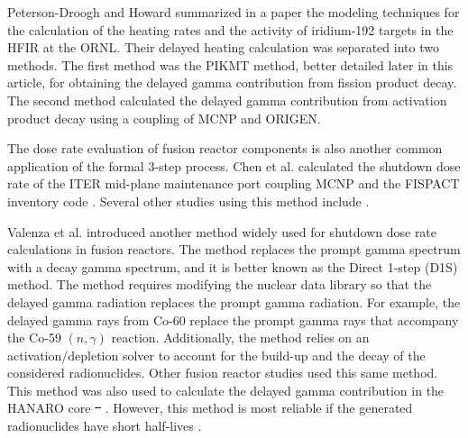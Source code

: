 \documentclass{style/nseJournal}
\providecommand{\DIFadd}[1]{{\protect\color{blue}\uwave{#1}}} %
\providecommand{\DIFdel}[1]{{\protect\color{red}\sout{#1}}}                      %
\providecommand{\DIFaddbegin}{} %
\providecommand{\DIFaddend}{} %
\providecommand{\DIFdelbegin}{} %
\providecommand{\DIFdelend}{} %
\begin{document}
Peterson-Droogh and Howard \cite{peterson-droogh_current_2018} summarized in a paper the modeling techniques for the calculation of the heating rates and the activity of iridium-192 targets in the \gls*{HFIR} at the \gls*{ORNL}.
Their delayed heating calculation was separated into two methods.
The first method was the PIKMT method, better detailed later in this article, for obtaining the delayed gamma contribution from fission product decay.
The second method calculated the delayed gamma contribution from activation product decay using a coupling of MCNP and ORIGEN.

The dose rate evaluation of fusion reactor components is also another common application of the formal 3-step process.
Chen et al. \cite{chen_rigorous_2002} calculated the shutdown dose rate of the ITER mid-plane maintenance port coupling MCNP and the FISPACT inventory code \cite{forrest_fispact_1998}.
Several other studies using this method include \cite{serikov_advanced_2002, sauvan_development_2016}.

Valenza et al. \cite{valenza_proposal_2001} introduced another method widely used for shutdown dose rate calculations in fusion reactors.
The method replaces the prompt gamma spectrum with a decay gamma spectrum, and it is better known as the Direct 1-step (D1S) method.
The method requires modifying the nuclear data library so that the delayed gamma radiation replaces the prompt gamma radiation.
For example, the delayed gamma rays from Co-60 replace the prompt gamma rays that accompany the Co-59 $(n, \gamma)$ reaction.
Additionally, the method relies on an activation/depletion solver to account for the build-up and the decay of the considered radionuclides.
Other fusion reactor studies \cite{petrizzi_improvement_2001, palermo_shutdown_2017} used this same method.
This method was also used to calculate the delayed gamma contribution in the HANARO core \DIFdelbegin \DIFdel{\mbox{%
\cite{lee_analysis_2008}}\hspace{0pt}%
}\DIFdelend \DIFaddbegin \DIFadd{\mbox{%
\cite{noh_estimation_2018}}\hspace{0pt}%
}\DIFaddend .
However, this method is most reliable if the generated radionuclides have short half-lives \cite{noh_estimation_2018}.
\end{document}
